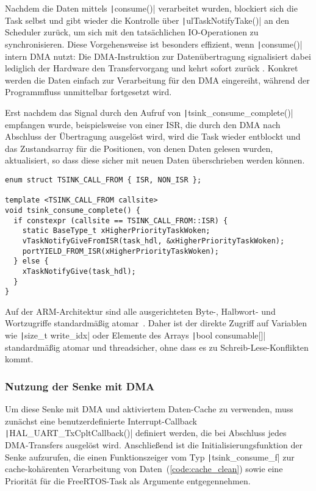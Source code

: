 Nachdem die Daten mittels \texttt|consume()| verarbeitet wurden,
blockiert sich die Task selbst und gibt wieder die Kontrolle über
\texttt|ulTaskNotifyTake()| an den Scheduler zurück, um sich mit den
tatsächlichen IO-Operationen zu synchronisieren. Diese Vorgehensweise ist
besonders effizient, wenn \texttt|consume()| intern DMA nutzt: Die
DMA-Instruktion zur Datenübertragung signalisiert dabei lediglich der Hardware
den Transfervorgang und kehrt sofort zurück \cite{HAL_UART_Transmit_DMA}.
Konkret werden die Daten einfach zur Verarbeitung für den DMA eingereiht,
während der Programmfluss unmittelbar fortgesetzt wird.

Erst nachdem das Signal durch den Aufruf von
\texttt|tsink_consume_complete()| empfangen wurde, beispielsweise von
einer \ac{ISR}, die durch den DMA nach Abschluss der Übertragung ausgelöst wird,
wird die Task wieder entblockt und das Zustandsarray für die Positionen, von
denen Daten gelesen wurden, aktualisiert, so dass diese sicher mit neuen Daten
überschrieben werden können.

\begin{code}
\begin{verbatim}
enum struct TSINK_CALL_FROM { ISR, NON_ISR };

template <TSINK_CALL_FROM callsite>
void tsink_consume_complete() {
  if constexpr (callsite == TSINK_CALL_FROM::ISR) {
    static BaseType_t xHigherPriorityTaskWoken;
    vTaskNotifyGiveFromISR(task_hdl, &xHigherPriorityTaskWoken);
    portYIELD_FROM_ISR(xHigherPriorityTaskWoken);
  } else {
    xTaskNotifyGive(task_hdl);
  }
}
\end{verbatim}
\end{code}

Auf der ARM-Architektur sind alle ausgerichteten Byte-, Halbwort- und
Wortzugriffe standardmäßig atomar~\cite[S. A3-79]{ARM_DDI0403_EE}. Daher ist der
direkte Zugriff auf Variablen wie \texttt|size_t write_idx| oder
Elemente des Arrays \texttt|bool consumable[]| standardmäßig atomar und
threadsicher, ohne dass es zu Schreib-Lese-Konflikten kommt.

\subsubsection{Nutzung der Senke mit DMA}

Um diese Senke mit DMA und aktiviertem Daten-Cache zu verwenden, muss zunächst
eine benutzerdefinierte Interrupt-Callback
\texttt|HAL_UART_TxCpltCallback()| definiert werden, die bei Abschluss
jedes DMA-Transfers ausgelöst wird. Anschließend ist die
Initialisierungsfunktion der Senke aufzurufen, die einen Funktionszeiger vom Typ
\texttt|tsink_consume_f| zur cache-kohärenten Verarbeitung von
Daten~(\ref{code:cache_clean}) sowie eine Priorität für die FreeRTOS-Task als
Argumente entgegennehmen.

